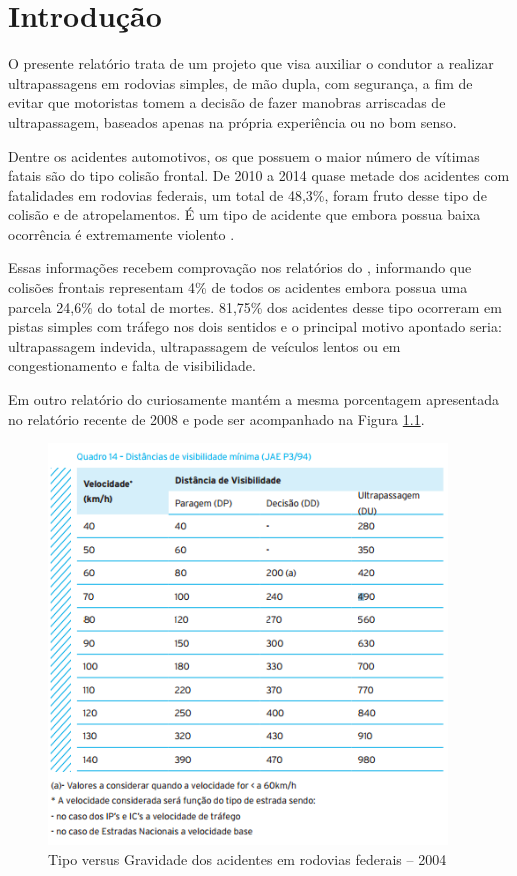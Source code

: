 \chapter[Introdução]{Introdução}
O presente relatório trata de um projeto que visa auxiliar o condutor a realizar
 ultrapassagens em rodovias simples, de mão dupla, com segurança, a fim de evitar
 que motoristas tomem a decisão de fazer manobras arriscadas de ultrapassagem,
baseados apenas na própria experiência ou no bom senso.

Dentre os acidentes automotivos, os que possuem o maior número de vítimas fatais
são do tipo colisão frontal. De 2010 a 2014 quase metade dos acidentes com
fatalidades em rodovias federais, um total de 48,3\%, foram fruto desse tipo
de colisão e de atropelamentos. É um tipo de acidente que embora possua baixa
ocorrência é extremamente violento \cite{ipea}.

Essas informações recebem comprovação nos relatórios do \cite{ipea}, informando
que colisões frontais representam 4\% de todos os acidentes embora possua uma
parcela 24,6\% do total de mortes. 81,75\% dos acidentes desse tipo ocorreram
em pistas simples com tráfego nos dois sentidos e o principal motivo apontado
seria: ultrapassagem indevida, ultrapassagem de veículos lentos ou em
congestionamento e falta de visibilidade. \cite{fatoresCondicionantesGravidade}

Em outro relatório do \cite{ipea} curiosamente mantém a mesma porcentagem
apresentada no relatório recente de 2008 e pode ser acompanhado na Figura \ref{fig:visibilidade}.
\cite{custos_acidentes_transito}

\begin{figure}[h]
  \centering
  \includegraphics[width=400px, scale=1]{figuras/visibilidade}
  \caption{Tipo versus Gravidade dos acidentes em rodovias federais – 2004}
\label{fig:visibilidade}
\end{figure}

